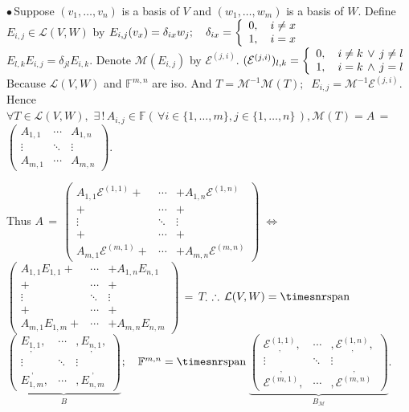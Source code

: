 \documentclass[a4paper, 11pt, UTF8]{article}
\def\Spn{{\timesnr\textup{span}}\,}
\def\Lm{\mathcal{L}}
\def\Mt{\mathcal{M}}
\def\Fbb{{\mathbb{F}}}
\def\BulletPoint{{\small$\bullet$}}
\begin{document}
\begin{large}
\BulletPoint \,\hspace{1pt}\NoteFor{[3.60]}\;\;Suppose $(v_1,\dots,v_n)$ is a basis of $V$ and $(w_1,\dots,w_m)$ is a basis of $W$.\TextB{\vspace{10pt}}
{Define $E_{i,j}\in\Lm(V,W)$ by $E_{i,j}(v_x)=\delta_{ix} w_j;\quad\delta_{ix}=\MathLeftBrace{l}{0,\quad i\neq x\\1,\quad i=x}\quad$} \Corollary\,\,\, {\Large$E_{l,k}E_{i,j}=\delta_{jl}E_{i,k}.$}\TextB{}
{\Large Denote $\Mt(E_{i,j})$ by $\mathcal{E}^{(j,i)}.$ $(\mathcal{E}^{(j,i)})_{l,k}=\MathLeftBrace{l}{0,\quad i\neq k\,\vee\,j\neq l\\1,\quad i=k\,\wedge\,j=l}$}\TextB{\vspace{6pt}}
{\Large Because $\Lm(V,W)$ and $\Fbb^{m,n}$ are iso. And $T=\Mt^{-1}\Mt(T);\;\;E_{i,j}=\Mt^{-1}\mathcal{E}^{(j,i)}$.}\TextB{}
Hence $\forall T\in\Lm(V,W),\,\,\exists\,!\,A_{i,j}\in\Fbb(\,\forall i\in\{1,\dots,m\},j\in\{1,\dots,n\}\,),\Mt(T)=A\,=\,${\normalsize$\begin{pmatrix} A_{1,1} & \cdots & A_{1,n}\\ \vdots & \ddots & \vdots\\ A_{m,1} & \cdots & A_{m,n}\end{pmatrix}$}.\par\quad
Thus $A\,=\,${\normalsize$\begin{pmatrix}
		A_{1,1}\mathcal{E}^{(1,1)}+&\cdots &+A_{1,n}\mathcal{E}^{(1,n)}\\
		+&\cdots &+\\
		\vdots & \ddots & \vdots\\
		+&\cdots &+\\
		A_{m,1}\mathcal{E}^{(m,1)}+&\cdots&+A_{m,n}\mathcal{E}^{(m,n)}
	\end{pmatrix} $}$\;\Longleftrightarrow\;${\normalsize$\begin{pmatrix}
		A_{1,1}E_{1,1}+&\cdots &+A_{1,n}E_{n,1}\\
		+&\cdots & +\\
		\vdots & \ddots & \vdots\\
		+&\cdots & +\\
		A_{m,1}E_{1,m}+&\cdots &+A_{m,n}E_{n,m}
	\end{pmatrix}$}$\,=\,T$.\vspace{6pt}\TextB{}
$\therefore\,\Lm(V,W)=\Spn${\normalsize$\underbrace{\begin{pmatrix} \underset{,}{E_{1,1}}, & \cdots & ,\underset{,}{E_{n,1}},\\ \vdots & \ddots & \vdots\\ \overset{,}{E_{1,m}}, & \cdots & ,\overset{,}{E_{n,m}}\end{pmatrix}}_{B}$}$;\quad\Fbb^{m,n}=\Spn${\normalsize$\underbrace{\begin{pmatrix} \underset{,}{\mathcal{E}^{(1,1)}}, & \cdots & ,\underset{,}{\mathcal{E}^{(1,n)}},\\ \vdots & \ddots & \vdots\\ \overset{,}{\mathcal{E}^{(m,1)}}, & \cdots & ,\overset{,}{\mathcal{E}^{(m,n)}}\end{pmatrix}}_{B_{\Mt}}$}.\TextB{\vspace{12pt}}

\end{large}
\end{document}
